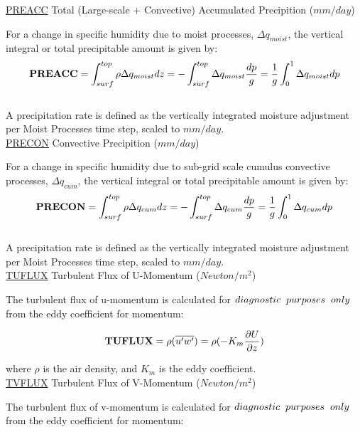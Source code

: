 \noindent
{ \underline {PREACC} Total (Large-scale + Convective) Accumulated Precipition ($mm/day$) } 

\noindent
For a change in specific humidity due to moist processes, $\Delta q_{moist}$, 
the vertical integral or total precipitable amount is given by:   
\[
{\bf PREACC} = \int_{surf}^{top} \rho \Delta q_{moist} dz = - \int_{surf}^{top} \Delta  q_{moist}
\frac{dp}{g} = \frac{1}{g} \int_0^1 \Delta q_{moist} dp
\]
\\

\noindent
A precipitation rate is defined as the vertically integrated moisture adjustment per Moist Processes
time step, scaled to $mm/day$.
\\

\noindent
{ \underline {PRECON} Convective Precipition ($mm/day$) } 

\noindent
For a change in specific humidity due to sub-grid scale cumulus convective processes, $\Delta q_{cum}$, 
the vertical integral or total precipitable amount is given by:   
\[
{\bf PRECON} = \int_{surf}^{top} \rho \Delta q_{cum} dz = - \int_{surf}^{top} \Delta  q_{cum}
\frac{dp}{g} = \frac{1}{g} \int_0^1 \Delta q_{cum} dp
\]
\\

\noindent
A precipitation rate is defined as the vertically integrated moisture adjustment per Moist Processes
time step, scaled to $mm/day$.
\\

\noindent
{ \underline {TUFLUX}  Turbulent Flux of U-Momentum ($Newton/m^2$) }

\noindent
The turbulent flux of u-momentum is calculated for $diagnostic \hspace{.2cm} purposes
 \hspace{.2cm} only$ from the eddy coefficient for momentum:

\[
{\bf TUFLUX} =  {\rho } {(\overline{u^{\prime}w^{\prime}})} =  
{\rho } {(- K_m \frac{\partial U}{\partial z})}
\]
 
\noindent
where $\rho$ is the air density, and $K_m$ is the eddy coefficient.
\\

\noindent
{ \underline {TVFLUX}  Turbulent Flux of V-Momentum ($Newton/m^2$) }

\noindent
The turbulent flux of v-momentum is calculated for $diagnostic \hspace{.2cm} purposes 
\hspace{.2cm} only$ from the eddy coefficient for momentum:

